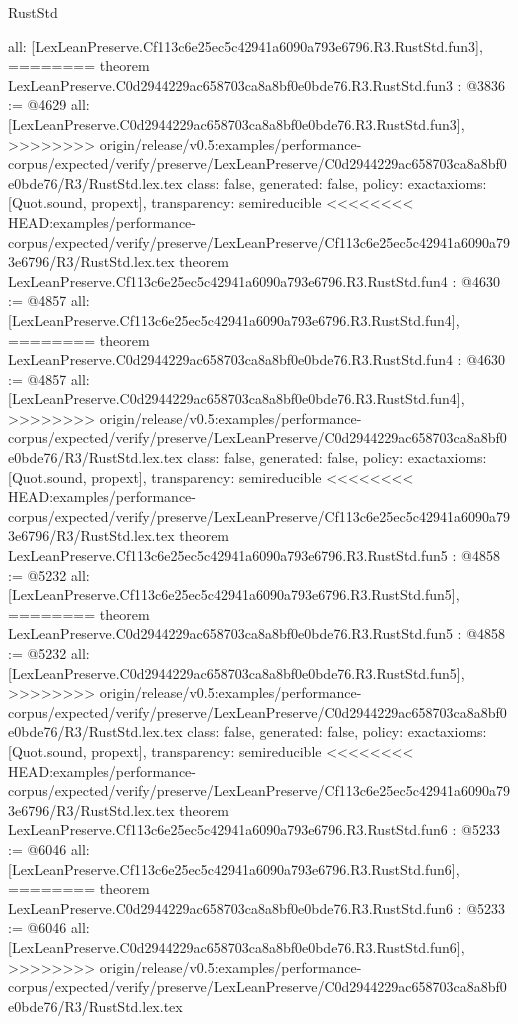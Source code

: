\begin{lexlean}{RustStd}
\begin{coremodule}
{\begin{coremodule}
{{{{{{  all: [LexLeanPreserve.Cf113c6e25ec5c42941a6090a793e6796.R3.RustStd.fun3],
========
theorem LexLeanPreserve.C0d2944229ac658703ca8a8bf0e0bde76.R3.RustStd.fun3 : @3836 := @4629 {
  all: [LexLeanPreserve.C0d2944229ac658703ca8a8bf0e0bde76.R3.RustStd.fun3],
>>>>>>>> origin/release/v0.5:examples/performance-corpus/expected/verify/preserve/LexLeanPreserve/C0d2944229ac658703ca8a8bf0e0bde76/R3/RustStd.lex.tex
  class: false,
  generated: false,
  policy: exact{axioms: [Quot.sound, propext]},
  transparency: semireducible
}
<<<<<<<< HEAD:examples/performance-corpus/expected/verify/preserve/LexLeanPreserve/Cf113c6e25ec5c42941a6090a793e6796/R3/RustStd.lex.tex
theorem LexLeanPreserve.Cf113c6e25ec5c42941a6090a793e6796.R3.RustStd.fun4 : @4630 := @4857 {
  all: [LexLeanPreserve.Cf113c6e25ec5c42941a6090a793e6796.R3.RustStd.fun4],
========
theorem LexLeanPreserve.C0d2944229ac658703ca8a8bf0e0bde76.R3.RustStd.fun4 : @4630 := @4857 {
  all: [LexLeanPreserve.C0d2944229ac658703ca8a8bf0e0bde76.R3.RustStd.fun4],
>>>>>>>> origin/release/v0.5:examples/performance-corpus/expected/verify/preserve/LexLeanPreserve/C0d2944229ac658703ca8a8bf0e0bde76/R3/RustStd.lex.tex
  class: false,
  generated: false,
  policy: exact{axioms: [Quot.sound, propext]},
  transparency: semireducible
}
<<<<<<<< HEAD:examples/performance-corpus/expected/verify/preserve/LexLeanPreserve/Cf113c6e25ec5c42941a6090a793e6796/R3/RustStd.lex.tex
theorem LexLeanPreserve.Cf113c6e25ec5c42941a6090a793e6796.R3.RustStd.fun5 : @4858 := @5232 {
  all: [LexLeanPreserve.Cf113c6e25ec5c42941a6090a793e6796.R3.RustStd.fun5],
========
theorem LexLeanPreserve.C0d2944229ac658703ca8a8bf0e0bde76.R3.RustStd.fun5 : @4858 := @5232 {
  all: [LexLeanPreserve.C0d2944229ac658703ca8a8bf0e0bde76.R3.RustStd.fun5],
>>>>>>>> origin/release/v0.5:examples/performance-corpus/expected/verify/preserve/LexLeanPreserve/C0d2944229ac658703ca8a8bf0e0bde76/R3/RustStd.lex.tex
  class: false,
  generated: false,
  policy: exact{axioms: [Quot.sound, propext]},
  transparency: semireducible
}
<<<<<<<< HEAD:examples/performance-corpus/expected/verify/preserve/LexLeanPreserve/Cf113c6e25ec5c42941a6090a793e6796/R3/RustStd.lex.tex
theorem LexLeanPreserve.Cf113c6e25ec5c42941a6090a793e6796.R3.RustStd.fun6 : @5233 := @6046 {
  all: [LexLeanPreserve.Cf113c6e25ec5c42941a6090a793e6796.R3.RustStd.fun6],
========
theorem LexLeanPreserve.C0d2944229ac658703ca8a8bf0e0bde76.R3.RustStd.fun6 : @5233 := @6046 {
  all: [LexLeanPreserve.C0d2944229ac658703ca8a8bf0e0bde76.R3.RustStd.fun6],
>>>>>>>> origin/release/v0.5:examples/performance-corpus/expected/verify/preserve/LexLeanPreserve/C0d2944229ac658703ca8a8bf0e0bde76/R3/RustStd.lex.tex
}}}}}}}}}}
\end{coremodule}}
\end{coremodule}
\end{lexlean}
